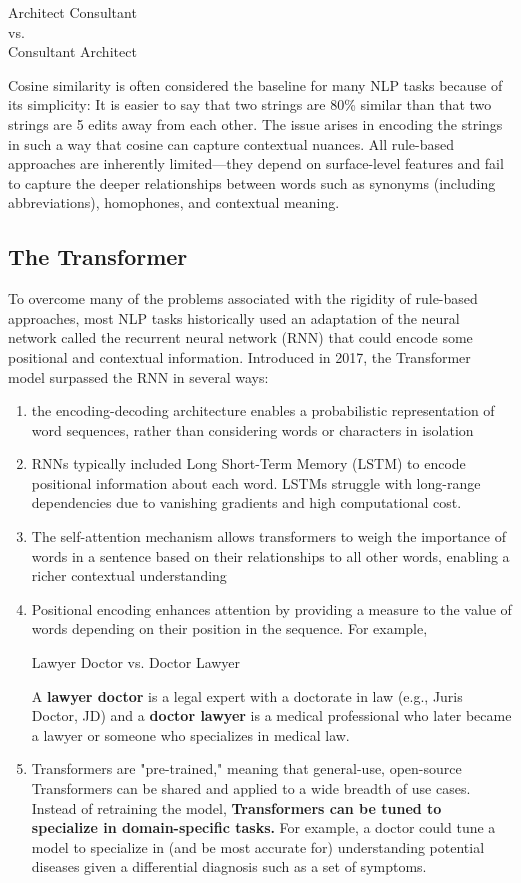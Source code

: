 \documentclass[12pt]{article}
\begin{document}
\begin{center}
    Architect Consultant\\vs.\\
    Consultant Architect
\end{center}


Cosine similarity is often considered the baseline for many NLP tasks because of its simplicity: It is easier to say that two strings are 80\% similar than that two strings are 5 edits away from each other. The issue arises in encoding the strings in such a way that cosine can capture contextual nuances. All rule-based approaches are inherently limited—they depend on surface-level features and fail to capture the deeper relationships between words such as synonyms (including abbreviations), homophones, and contextual meaning.




\subsection{The Transformer}\label{sec:transformer}
To overcome many of the problems associated with the rigidity of rule-based approaches, most NLP tasks historically used an adaptation of the neural network called the recurrent neural network (RNN) that could encode some positional and contextual information. Introduced in 2017, the Transformer model surpassed the RNN in several ways: 
\begin{enumerate}
    \item the encoding-decoding architecture enables a probabilistic representation of word sequences, rather than considering words or characters in isolation
    \item RNNs typically included Long Short-Term Memory (LSTM) to encode positional information about each word. LSTMs struggle with long-range dependencies due to vanishing gradients and high computational cost.
    \item The self-attention mechanism allows transformers to weigh the importance of words in a sentence based on their relationships to all other words, enabling a richer contextual understanding
    \item Positional encoding enhances attention by providing a measure to the value of words depending on their position in the sequence. For example, 
    \begin{center}
        Lawyer Doctor vs. Doctor Lawyer \end{center}
A \textbf{lawyer doctor} is a legal expert with a doctorate in law (e.g., Juris Doctor, JD) and a \textbf{doctor lawyer} is a medical professional who later became a lawyer or someone who specializes in medical law.
\item Transformers are "pre-trained," meaning that general-use, open-source Transformers can be shared and applied to a wide breadth of use cases. Instead of retraining the model, \textbf{Transformers can be tuned to specialize in domain-specific tasks.} For example, a doctor could tune a model to specialize in (and be most accurate for) understanding potential diseases given a differential diagnosis such as a set of symptoms. 
\end{enumerate}
\end{document}
